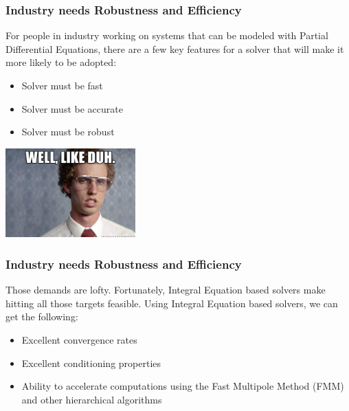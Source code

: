 \documentclass{beamer}
\begin{document}
	\begin{frame}
	\frametitle{Industry needs Robustness and Efficiency}
	For people in industry working on systems that can be modeled with Partial Differential Equations, there are a few key features for a solver that will make it more likely to be adopted:
	
	\begin{itemize}
		\item Solver must be fast
		\item Solver must be accurate
		\item Solver must be robust 
	\end{itemize}

	\vspace{0.1in}
	\begin{center}
		\includegraphics[width=5cm,frame]{likeDuh}
	\end{center}
	\end{frame}

	\begin{frame}
	\frametitle{Industry needs Robustness and Efficiency}
	Those demands are lofty. Fortunately, Integral Equation based solvers make hitting all those targets feasible. Using Integral Equation based solvers, we can get the following:
	
	\begin{itemize}
		\item Excellent convergence rates
		\item Excellent conditioning properties
		\item Ability to accelerate computations using the Fast Multipole Method (FMM) and other hierarchical algorithms
	\end{itemize}
	\end{frame}
\end{document}
